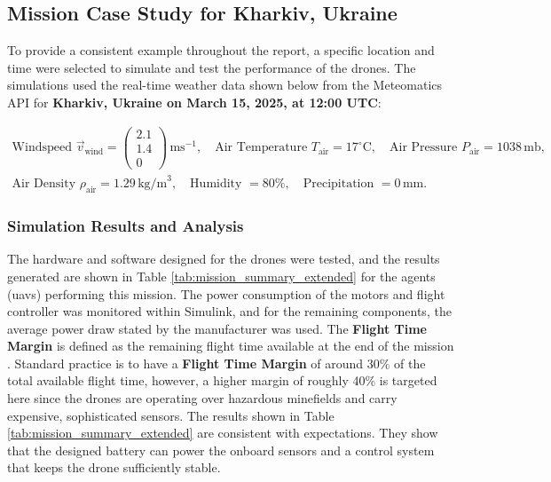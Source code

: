 \subsection{Mission Case Study for Kharkiv, Ukraine}
\label{mocs}

To provide a consistent example throughout the report, a specific location and time were selected to simulate and test the performance of the drones. The simulations used the real-time weather data shown below from the Meteomatics API for \textbf{Kharkiv, Ukraine on March 15, 2025, at 12:00 UTC}: \vspace{-3em}

\begin{gather*}
\text{Windspeed } \vec{v}_{\text{wind}} = \begin{pmatrix}2.1 \\ 1.4 \\ 0\end{pmatrix}\,\text{ms}^{-1},\quad 
\text{Air Temperature } T_{\text{air}} = 17^\circ\text{C},\quad 
\text{Air Pressure } P_{\text{air}} = 1038\,\text{mb}, \\
\text{Air Density } \rho_{\text{air}} = 1.29\,\text{kg/m}^3,\quad 
\text{Humidity } = 80\%,\quad 
\text{Precipitation } = 0\,\text{mm}.
\end{gather*}

\subsubsection{Simulation Results and Analysis}
\label{simdata}

The hardware and software designed for the drones were tested, and the results generated are shown in Table \ref{tab:mission_summary_extended} for the agents (\gls{uav}s) performing this mission. The power consumption of the motors and flight controller was monitored within Simulink, and for the remaining components, the average power draw stated by the manufacturer was used. The \textbf{Flight Time Margin} is defined as the remaining flight time available at the end of the mission \cite{technologies11010012}. Standard practice is to have a \textbf{Flight Time Margin} of around 30\% of the total available flight time, however, a higher margin of roughly 40\% is targeted here since the drones are operating over hazardous minefields and carry expensive, sophisticated sensors. The results shown in Table \ref{tab:mission_summary_extended} are consistent with expectations. They show that the designed battery can power the onboard sensors and a control system that keeps the drone sufficiently stable.

